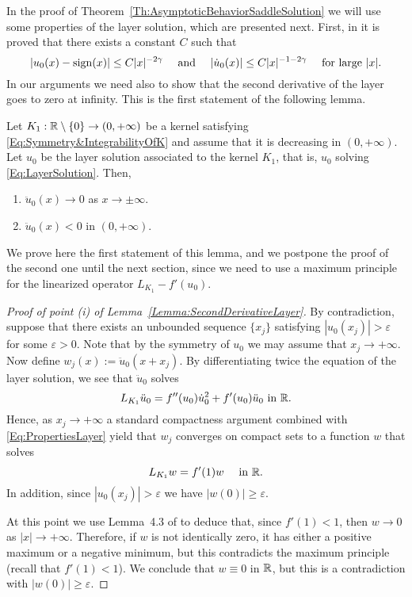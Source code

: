 In the proof of Theorem~\ref{Th:AsymptoticBehaviorSaddleSolution} we will use some properties of the layer solution, which are presented next. First, in \cite{CozziPassalacqua} it is proved that there exists a constant $C$ such that
\begin{equation}
	\label{Eq:PropertiesLayer}
	|u_0 (x)-\operatorname{sign}(x)| \leq C |x|^{-2\gamma}  \quad \text{ and } \quad |\dot{u}_0 (x)| \leq C |x|^{-1-2\gamma}  \quad \text{ for large }|x|.
\end{equation}
In our arguments we need also to show that the second derivative of the layer goes to zero at infinity. This is the first statement of the following lemma.

\begin{lemma}
	\label{Lemma:SecondDerivativeLayer}
	Let $K_1:\mathbb{R} \setminus \{0\} \to (0,+\infty)$ be a kernel satisfying \eqref{Eq:Symmetry&IntegrabilityOfK} and assume that it is decreasing in $(0,+\infty)$. Let $u_0$ be the layer solution associated to the kernel $K_1$, that is, $u_0$ solving \eqref{Eq:LayerSolution}. Then, 
	\begin{enumerate}[label=(\roman{*})]
		\item $\ddot{u}_0 (x) \to 0$ as $x\to \pm \infty$.	
		\item  $\ddot{u}_0 (x) < 0$ in $(0,+\infty)$.
	\end{enumerate}
\end{lemma}

We prove here the first statement of this lemma, and we postpone the proof of the second one until the next section, since we need to use a maximum principle for the linearized operator $L_{K_1} - f'(u_0)$.

\begin{proof}[Proof of point (i) of Lemma~\ref{Lemma:SecondDerivativeLayer}]
	By contradiction, suppose that there exists an unbounded sequence $\{x_j\}$ satisfying $|u_0(x_j)|>\varepsilon$ for some $\varepsilon>0$. Note that by the symmetry of $u_0$ we may assume that $x_j\to + \infty$. Now define $w_j (x) := \ddot{u}_0(x+x_j)$. By differentiating twice the equation of the layer solution, we see that $\ddot{u}_0$ solves
	$$
	L_{K_1} \ddot{u}_0 = f''(u_0)\dot{u}_0^2 + f'(u_0)\ddot{u}_0 \text{ in }\mathbb{R}.
	$$
	Hence, as $x_j \to +\infty$ a standard compactness argument combined with \eqref{Eq:PropertiesLayer} yield that $w_j$ converges on compact sets to a function $w$ that solves
	$$
	L_{K_1}  w = f'(1)w \quad \text{ in }\mathbb{R}.
	$$
	In addition, since $|u_0(x_j)|>\varepsilon$ we have $|w(0)|\geq \varepsilon$.
	
	At this point we use Lemma~4.3 of \cite{CozziPassalacqua} to deduce that, since $f'(1)<1$, then $w\to 0$ as $|x| \to +\infty$. Therefore, if $w$ is not identically zero, it has either a positive maximum or a negative minimum, but this contradicts the maximum principle (recall that $f'(1)<1$). We conclude that $w\equiv0$ in $\mathbb{R}$, but this is a contradiction with $|w(0)|\geq \varepsilon$.
\end{proof}




